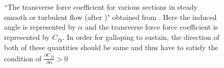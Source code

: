 \begin{figure}
	
  \setlength{\unitlength}{\textwidth}

  \caption{ ``The transverse force coefficient for various sections in steady smooth or turbulent flow (after \citet{Blevins1990})" obtained from \citet{Paidoussis2010}. Here the induced angle is represented by $\alpha$ and the transverse force force coefficient is represented by $C_{fy}$. In order for galloping to sustain, the direction of both of these quantities should be same and thus have to satisfy the condition of $\frac{\partial C_{fy}}{\partial \alpha } >0$}
    \label{fig:par_diff_cross_sec}
\end{figure}

